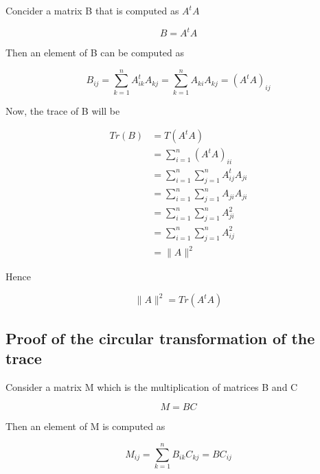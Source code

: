 \documentclass[12pt,journal]{IEEEtran}
\begin{document}
    Concider a matrix B that is computed as $A^tA$

    \begin{equation*}
        B = A^tA
    \end{equation*}

    Then an element of B can be computed as

    \begin{equation*}
        B_{ij} = \sum_{k=1}^n A_{ik}^t A_{kj} = \sum_{k=1}^n A_{ki} A_{kj} = (A^tA)_{ij}
    \end{equation*}

    Now, the trace of B will be

    \begin{equation*}
        \begin{aligned}
            Tr(B) &= T(A^tA)\\
                  &= \sum_{i=1}^n (A^tA)_{ii}\\
                  &= \sum_{i=1}^n \sum_{j=1}^n A_{ij}^t A_{ji}\\
                  &= \sum_{i=1}^n \sum_{j=1}^n A_{ji} A_{ji}\\
                  &= \sum_{i=1}^n \sum_{j=1}^n A_{ji}^2 \\
                  &= \sum_{i=1}^n \sum_{j=1}^n A_{ij}^2 \\
                  &= \lVert A \rVert^2
        \end{aligned}
    \end{equation*}

    Hence

    \begin{equation*}
        \lVert A \rVert^2 = Tr(A^tA)
    \end{equation*}

    \subsection{Proof of the circular transformation of the trace} \label{circular_trace}

    Consider a matrix M which is the multiplication of matrices B and C

    \begin{equation*}
        M = BC
    \end{equation*}

    Then an element of M is computed as

    \begin{equation*}
        M_{ij} = \sum_{k=1}^n B_{ik} C_{kj} = BC_{ij}
    \end{equation*}
\end{document}
